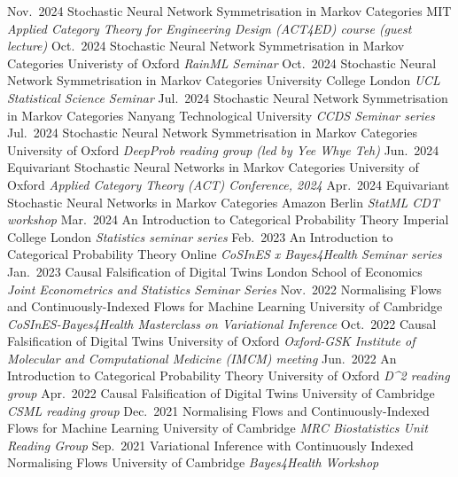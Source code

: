 \documentclass[9pt]{developercv} %
\begin{document}

\begin{entrylist}
    \entry
        {Nov.\ 2024}
        {Stochastic Neural Network Symmetrisation in Markov Categories}
        {MIT}
        {\textit{Applied Category Theory for Engineering Design (ACT4ED) course (guest lecture)}}
    \entry
        {Oct.\ 2024}
        {Stochastic Neural Network Symmetrisation in Markov Categories}
        {Univeristy of Oxford}
        {\textit{RainML Seminar}}
    \entry
        {Oct.\ 2024}
        {Stochastic Neural Network Symmetrisation in Markov Categories}
        {University College London}
        {\textit{UCL Statistical Science Seminar}}
    \entry
        {Jul.\ 2024}
        {Stochastic Neural Network Symmetrisation in Markov Categories}
        {Nanyang Technological University}
        {\textit{CCDS Seminar series}}
    \entry
        {Jul.\ 2024}
        {Stochastic Neural Network Symmetrisation in Markov Categories}
        {University of Oxford}
        {\textit{DeepProb reading group (led by Yee Whye Teh)}}
    \entry
        {Jun.\ 2024}
        {Equivariant Stochastic Neural Networks in Markov Categories}
        {University of Oxford}
        {\textit{Applied Category Theory (ACT) Conference, 2024}}
    \entry
        {Apr.\ 2024}
        {Equivariant Stochastic Neural Networks in Markov Categories}
        {Amazon Berlin}
        {\textit{StatML CDT workshop}}
    \entry
        {Mar.\ 2024}
        {An Introduction to Categorical Probability Theory}
        {Imperial College London}
        {\textit{Statistics seminar series}}
    \entry
        {Feb.\ 2023}
        {An Introduction to Categorical Probability Theory}
        {Online}
        {\textit{CoSInES x Bayes4Health Seminar series}}
    \entry
        {Jan.\ 2023}
        {Causal Falsification of Digital Twins}
        {London School of Economics}
        {\textit{Joint Econometrics and Statistics Seminar Series}}
    \entry
        {Nov.\ 2022}
        {Normalising Flows and Continuously-Indexed Flows for Machine Learning}
        {University of Cambridge}
        {\textit{CoSInES-Bayes4Health Masterclass on Variational Inference}}
    \entry
        {Oct.\ 2022}
        {Causal Falsification of Digital Twins}
        {University of Oxford}
        {\textit{Oxford-GSK Institute of Molecular and Computational Medicine (IMCM) meeting}}
    \entry
        {Jun.\ 2022}
        {An Introduction to Categorical Probability Theory}
        {University of Oxford}
        {\textit{D\textasciicircum 2 reading group}}
    \entry
        {Apr.\ 2022}
        {Causal Falsification of Digital Twins}
        {University of Cambridge}
        {\textit{CSML reading group}}
    \entry
        {Dec.\ 2021}
        {Normalising Flows and Continuously-Indexed Flows for Machine Learning}
        {University of Cambridge}
        {\textit{MRC Biostatistics Unit Reading Group}}
    \entry
        {Sep.\ 2021}%
        {Variational Inference with Continuously Indexed Normalising Flows}
        {University of Cambridge}
        {\textit{Bayes4Health Workshop}}
\end{entrylist}
\end{document}
